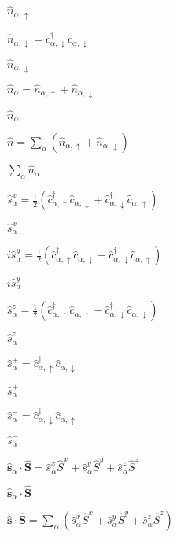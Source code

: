 \documentclass{article}
\begin{document}
$ \hat{n}_{\alpha, \uparrow}$
\pagebreak

$ \hat{n}_{\alpha, \downarrow}=\hat{c}^{\dagger}_{\alpha, \downarrow}\hat{c}_{\alpha, \downarrow}$
\pagebreak

$ \hat{n}_{\alpha, \downarrow}$
\pagebreak

$ \hat{n}_{\alpha}=\hat{n}_{\alpha, \uparrow} + \hat{n}_{\alpha, \downarrow}$
\pagebreak

$ \hat{n}_{\alpha}$
\pagebreak

$ \hat{n}=\sum_{\alpha}\left(\hat{n}_{\alpha, \uparrow} + \hat{n}_{\alpha, \downarrow}\right)$
\pagebreak

$ \sum_{\alpha}\hat{n}_{\alpha}$
\pagebreak

$ \hat{s}^{x}_{\alpha}=\frac{1}{2}(\hat{c}^{\dagger}_{\alpha, \uparrow}\hat{c}_{\alpha, \downarrow} + \hat{c}^{\dagger}_{\alpha, \downarrow}\hat{c}_{\alpha, \uparrow})$
\pagebreak

$ \hat{s}^{x}_{\alpha}$
\pagebreak

$ i\hat{s}^{y}_{\alpha}=\frac{1}{2}(\hat{c}^{\dagger}_{\alpha, \uparrow}\hat{c}_{\alpha, \downarrow} - \hat{c}^{\dagger}_{\alpha, \downarrow}\hat{c}_{\alpha, \uparrow})$
\pagebreak

$ i\hat{s}^{y}_{\alpha}$
\pagebreak

$ \hat{s}^{z}_{\alpha}=\frac{1}{2}(\hat{c}^{\dagger}_{\alpha, \uparrow}\hat{c}_{\alpha, \uparrow} - \hat{c}^{\dagger}_{\alpha, \downarrow}\hat{c}_{\alpha, \downarrow})$
\pagebreak

$ \hat{s}^{z}_{\alpha}$
\pagebreak

$ \hat{s}^{+}_{\alpha}=\hat{c}^{\dagger}_{\alpha, \uparrow}\hat{c}_{\alpha, \downarrow}$
\pagebreak

$ \hat{s}^{+}_{\alpha}$
\pagebreak

$ \hat{s}^{-}_{\alpha}=\hat{c}^{\dagger}_{\alpha, \downarrow}\hat{c}_{\alpha, \uparrow}$
\pagebreak

$ \hat{s}^{-}_{\alpha}$
\pagebreak

$ \hat{\boldsymbol{s}}_{\alpha}\cdot\hat{\boldsymbol{S}}= \hat{s}^{x}_{\alpha}\hat{S}^{x}+\hat{s}^{y}_{\alpha}\hat{S}^{y}+\hat{s}^{z}_{\alpha}\hat{S}^{z}$
\pagebreak

$ \hat{\boldsymbol{s}}_{\alpha}\cdot\hat{\boldsymbol{S}}$
\pagebreak

$ \hat{\boldsymbol{s}}\cdot\hat{\boldsymbol{S}}= \sum_{\alpha}\left(\hat{s}^{x}_{\alpha}\hat{S}^{x}+\hat{s}^{y}_{\alpha}\hat{S}^{y} +\hat{s}^{z}_{\alpha}\hat{S}^{z}\right)$
\pagebreak
\end{document}
